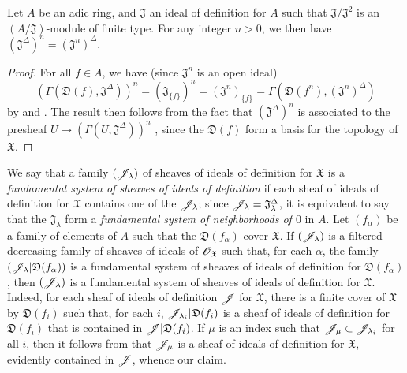 \begin{proposition}[10.3.6]
\label{1.10.3.6}
Let $A$ be an adic ring, and $\mathfrak{J}$ an ideal of definition for $A$ such that $\mathfrak{J}/\mathfrak{J}^2$ is an $(A/\mathfrak{J})$-module of finite type. For any integer $n>0$, we then have $(\mathfrak{J}^\Delta)^n=(\mathfrak{J}^n)^\Delta$.
\end{proposition}

\begin{proof}
\label{proof-1.10.3.6}
For all $f\in A$, we have (since $\mathfrak{J}^n$ is an open ideal)
\[
  (\Gamma(\mathfrak{D}(f),\mathfrak{J}^\Delta))^n=(\mathfrak{J}_{\{f\}})^n=(\mathfrak{J}^n)_{\{f\}}=\Gamma(\mathfrak{D}(f^n),(\mathfrak{J}^n)^\Delta)
\]
by  and .
The result then follows from the fact that $(\mathfrak{J}^\Delta)^n$ is associated to the presheaf $U\mapsto(\Gamma(U,\mathfrak{J}^\Delta))^n$ , since the $\mathfrak{D}(f)$ form a basis for the topology of $\mathfrak{X}$.
\end{proof}

\begin{env}[10.3.7]
\label{1.10.3.7}
We say that a family $(\mathscr{J}_\lambda)$ of sheaves of ideals of definition for $\mathfrak{X}$ is a \emph{fundamental system of sheaves of ideals of definition} if each sheaf of ideals of definition for $\mathfrak{X}$ contains one of the $\mathscr{J}_\lambda$; since $\mathscr{J}_\lambda=\mathfrak{J}_\lambda^\Delta$, it is equivalent to say that the $\mathfrak{J}_\lambda$ form a \emph{fundamental system of neighborhoods of $0$} in $A$.
Let $(f_\alpha)$ be a family of elements of $A$ such that the $\mathfrak{D}(f_\alpha)$ cover $\mathfrak{X}$.
If $(\mathscr{J}_\lambda)$ is a filtered decreasing family of sheaves of ideals of $\mathscr{O}_\mathfrak{X}$ such that, for each $\alpha$, the family $(\mathscr{J}_\lambda|\mathfrak{D}(f_\alpha))$ is a fundamental system of sheaves of ideals of definition for $\mathfrak{D}(f_\alpha)$, then $(\mathscr{J}_\lambda)$ is a fundamental system of sheaves of ideals of definition for $\mathfrak{X}$.
Indeed, for each sheaf of ideals of definition $\mathscr{J}$ for $\mathfrak{X}$, there is a finite cover of $\mathfrak{X}$ by $\mathfrak{D}(f_i)$ such that, for each $i$, $\mathscr{J}_{\lambda_i}|\mathfrak{D}(f_i)$ is a sheaf of ideals of definition for $\mathfrak{D}(f_i)$ that is contained in $\mathscr{J}|\mathfrak{D}(f_i)$.
If $\mu$ is an index such that $\mathscr{J}_\mu\subset\mathscr{J}_{\lambda_i}$ for all $i$, then it follows from  that $\mathscr{J}_\mu$ is a sheaf of ideals of definition for $\mathfrak{X}$, evidently contained in $\mathscr{J}$, whence our claim.
\end{env}

